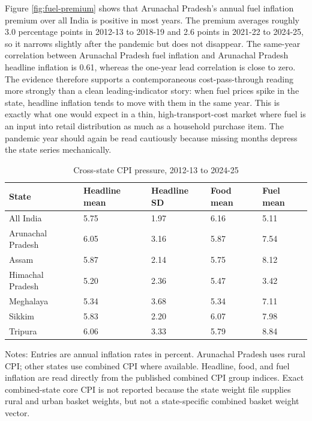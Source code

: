 \documentclass[11pt,a4paper]{article}
\begin{document}
Figure \ref{fig:fuel-premium} shows that Arunachal Pradesh's annual fuel inflation premium over all India is positive in most years. The premium averages roughly 3.0 percentage points in 2012-13 to 2018-19 and 2.6 points in 2021-22 to 2024-25, so it narrows slightly after the pandemic but does not disappear. The same-year correlation between Arunachal Pradesh fuel inflation and Arunachal Pradesh headline inflation is 0.61, whereas the one-year lead correlation is close to zero. The evidence therefore supports a contemporaneous cost-pass-through reading more strongly than a clean leading-indicator story: when fuel prices spike in the state, headline inflation tends to move with them in the same year. This is exactly what one would expect in a thin, high-transport-cost market where fuel is an input into retail distribution as much as a household purchase item. The pandemic year should again be read cautiously because missing months depress the state series mechanically.

\begin{table}[H]
\centering
\caption{Cross-state CPI pressure, 2012-13 to 2024-25}
\label{tab:cpi-comparison}
\begin{tabular}{L{3.4cm}C{2.1cm}C{2.1cm}C{2.1cm}C{2.1cm}}
\toprule
State & Headline mean & Headline SD & Food mean & Fuel mean \\
\midrule
All India & 5.75 & 1.97 & 6.16 & 5.11 \\
Arunachal Pradesh & 6.05 & 3.16 & 5.87 & 7.54 \\
Assam & 5.87 & 2.14 & 5.75 & 8.12 \\
Himachal Pradesh & 5.20 & 2.36 & 5.47 & 3.42 \\
Meghalaya & 5.34 & 3.68 & 5.34 & 7.11 \\
Sikkim & 5.83 & 2.20 & 6.07 & 7.98 \\
Tripura & 6.06 & 3.33 & 5.79 & 8.84 \\
\bottomrule
\end{tabular}
\begin{flushleft}
\footnotesize Notes: Entries are annual inflation rates in percent. Arunachal Pradesh uses rural CPI; other states use combined CPI where available. Headline, food, and fuel inflation are read directly from the published combined CPI group indices. Exact combined-state core CPI is not reported because the state weight file supplies rural and urban basket weights, but not a state-specific combined basket weight vector.
\end{flushleft}
\end{table}
\end{document}
